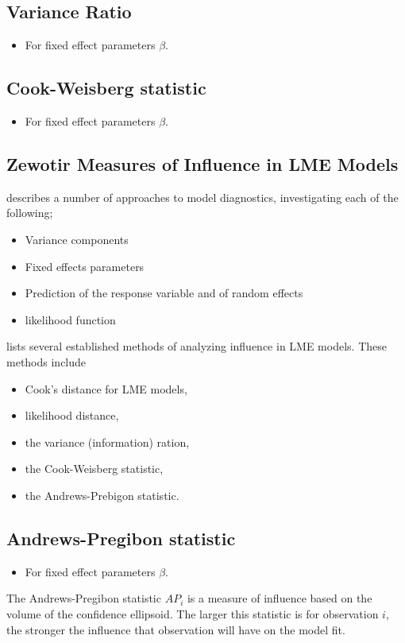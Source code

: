 \documentclass[Main.tex]{subfiles}
\begin{document}
\subsection{Variance Ratio} %
\begin{itemize}
	\item For fixed effect parameters $\beta$.
\end{itemize}

	
	\subsection{Cook-Weisberg statistic} %
	\begin{itemize}
		\item For fixed effect parameters $\beta$.
	\end{itemize}
	\subsection{Zewotir Measures of Influence in LME Models}%
	\citet{Zewotir} describes a number of approaches to model diagnostics, investigating each of the following;
	\begin{itemize}
		\item Variance components
		\item Fixed effects parameters
		\item Prediction of the response variable and of random effects
		\item likelihood function
	\end{itemize}
	


\citet{Zewotir} lists several established methods of analyzing influence in LME models. These methods include \begin{itemize}
	\item Cook's distance for LME models,
	\item {} likelihood distance,
	\item the variance (information) ration,
	\item the  Cook-Weisberg statistic,
	\item the  Andrews-Prebigon statistic.
\end{itemize}


	
	\subsection{Andrews-Pregibon statistic} %
	\begin{itemize}
		\item For fixed effect parameters $\beta$.
	\end{itemize}
	The Andrews-Pregibon statistic $AP_{i}$ is a measure of influence based on the volume of the confidence ellipsoid.
	The larger this statistic is for observation $i$, the stronger the influence that observation will have on the model fit.
\end{document}
